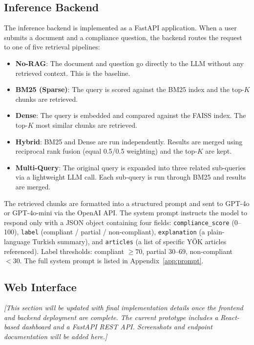 \subsection{Inference Backend}

The inference backend is implemented as a FastAPI application.
When a user submits a document and a compliance question, the backend
routes the request to one of five retrieval pipelines:

\begin{itemize}
  \item \textbf{No-RAG}: The document and question go directly to the LLM
    without any retrieved context. This is the baseline.
  \item \textbf{BM25 (Sparse)}: The query is scored against the BM25 index
    and the top-$K$ chunks are retrieved.
  \item \textbf{Dense}: The query is embedded and compared against the FAISS
    index. The top-$K$ most similar chunks are retrieved.
  \item \textbf{Hybrid}: BM25 and Dense are run independently.
    Results are merged using reciprocal rank fusion (equal 0.5/0.5 weighting)
    and the top-$K$ are kept.
  \item \textbf{Multi-Query}: The original query is expanded into three
    related sub-queries via a lightweight LLM call.
    Each sub-query is run through BM25 and results are merged.
\end{itemize}

The retrieved chunks are formatted into a structured prompt and sent to
GPT-4o or GPT-4o-mini via the OpenAI API.
The system prompt instructs the model to respond only with a JSON object
containing four fields: \texttt{compliance\_score} (0--100),
\texttt{label} (compliant / partial / non-compliant),
\texttt{explanation} (a plain-language Turkish summary), and
\texttt{articles} (a list of specific YÖK articles referenced).
Label thresholds: compliant $\geq 70$, partial $30$--$69$,
non-compliant $< 30$.
The full system prompt is listed in Appendix~\ref{app:prompt}.

\subsection{Web Interface}

\textit{[This section will be updated with final implementation details
once the frontend and backend deployment are complete.
The current prototype includes a React-based dashboard and a FastAPI
REST API. Screenshots and endpoint documentation will be added here.]}

